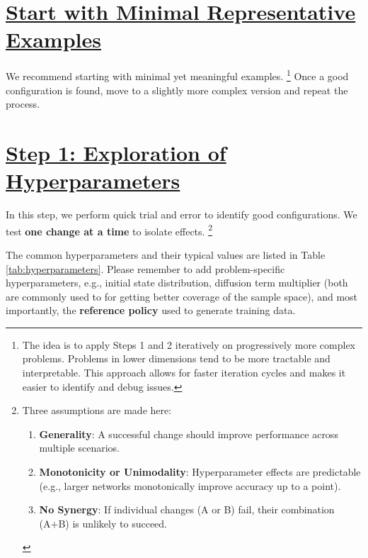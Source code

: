 \documentclass{tufte-handout}
\begin{document}

\section{\underline{Start with Minimal Representative Examples}}\label{sec:minimal-examples}

\noindent
We recommend starting with minimal yet meaningful examples.
\footnote{
    The idea is to apply Steps 1 and 2 iteratively on progressively more complex problems.
    Problems in lower dimensions tend to be more tractable and interpretable.
    This approach allows for faster iteration cycles and makes it easier to identify and debug issues. 
}
Once a good configuration is found, move to a slightly more complex version and repeat the process.




\section{\underline{Step 1: Exploration of Hyperparameters}}\label{sec:explore-hyperparameters}

In this step, we perform quick trial and error to identify good configurations. 
We test \textbf{one change at a time} to isolate effects.
\footnote{
    Three assumptions are made here: 
    \begin{enumerate}
        \item \textbf{Generality}: A successful change should improve performance across multiple scenarios. 
        \item \textbf{Monotonicity or Unimodality}: Hyperparameter effects are predictable (e.g., larger networks monotonically improve accuracy up to a point).
        \item \textbf{No Synergy}: If individual changes (A or B) fail, their combination (A+B) is unlikely to succeed.
    \end{enumerate}
} 

The common hyperparameters and their typical values are listed in Table \ref{tab:hyperparameters}.
Please remember to add problem-specific hyperparameters, e.g., initial state distribution, diffusion term multiplier (both are commonly used to for getting better coverage of the sample space), and most importantly, the \textbf{reference policy} used to generate training data.
\end{document}
